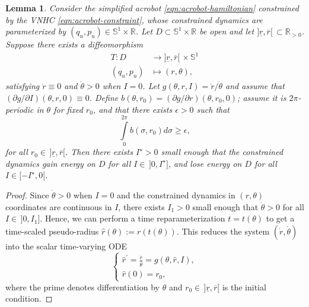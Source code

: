 \documentclass[journal,twoside,web]{ieeecolor}
\newtheorem{lemma}{Lemma} %
\newcommand*{\R}{\mathbb{R}}
\newcommand*{\Sone}{\mathbb{S}^1}
\newcommand*{\SxR}{\Sone \times \R}
\begin{document}
{\begin{lemma}\label{lemma:energy-regulation-D}
    Consider the simplified acrobot \eqref{eqn:acrobot-hamiltonian} constrained
    by the VNHC \eqref{eqn:acrobot-constraint}, whose constrained dynamics are
    parameterized by \((q_u,p_u) \in \SxR\).
    Let \(D \subset \SxR\) be open and 
    let \(]\underline{r}, \overline{r}[ \, \subset \R_{> 0}\).
    Suppose there exists a diffeomorphism 
    \begin{align*}
        T : D &\to ]\underline{r},\overline{r}[ \, \times \Sone \\
        (q_u,p_u) &\mapsto (r,\theta)
        ,
    \end{align*}
    satisfying \(\dot{r} \equiv 0\) and \(\dot{\theta} > 0\) when
    \(I = 0\).
    Let \(g(\theta,r,I) = \dot{r}/\dot{\theta}\) and assume that 
    \((\partial g/\partial I)(\theta,r,0) \equiv 0\).
    Define \(b(\theta,r_0) = (\partial g/\partial r)(\theta,r_0,0)\);
    assume it is \(2\pi\)-periodic in \(\theta\) for fixed \(r_0\),
    and that there exists \(\epsilon > 0\) such that 
    \[
        \int \limits_0^{2\pi} b(\sigma,r_0)d\sigma \geq \epsilon
        ,
    \]
    for all \(r_0 \in \, ]\underline{r},\overline{r}[\).
    Then there exists \(I^\star > 0\) small enough that the constrained dynamics
    gain energy on \(D\) for all \(I \in \,]0, I^\star]\), and lose energy on \(D\)
    for all \(I \in [-I^\star, 0[\).
\end{lemma}
\begin{proof}
    Since \(\dot{\theta} > 0\) when \(I = 0\) and the constrained dynamics 
    in \((r,\theta)\) coordinates are continuous in \(I\), there exists 
    \(I_1 > 0\) small enough that \(\dot{\theta} > 0\) for all
    \(I \in \, ]0,I_1]\).
    Hence, we can perform a time reparameterization \(t = t(\theta)\) to get a
    time-scaled pseudo-radius \(\hat{r}(\theta) := r(t(\theta))\).
    This reduces the system \((\dot{r},\dot{\theta})\) into the scalar
    time-varying ODE 
    \begin{equation}\label{eqn:rhat-ode}
        \begin{cases}
            \hat{r}^\prime= \frac{\dot{r}}{\dot{\theta}} =
            g(\theta,\hat{r},I)
            , \\
            \hat{r}(0) = r_0
            ,
        \end{cases}
    \end{equation}
    where the prime denotes differentiation by \(\theta\) and 
    \(r_0 \in \, ]\underline{r},\overline{r}[\) is the initial condition.


\end{proof}}
\end{document}
